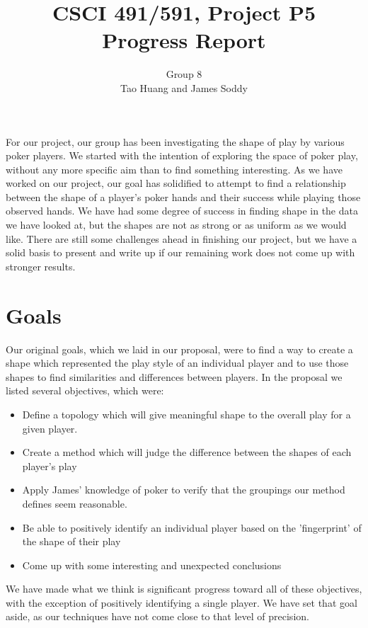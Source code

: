 \documentclass[11pt]{article}
\title{CSCI 491/591, Project P5\\
		\small{Progress Report}}
\author{Group 8\\
		\small{Tao Huang and James Soddy}}
\begin{document}
\maketitle

For our project, our group has been investigating the shape of play by various
poker players. We started with the intention of exploring the space of poker
play, without any more specific aim than to find something interesting. As we
have worked on our project, our goal has solidified to attempt to find a 
relationship between the shape of a player's poker hands and their success
while playing those observed hands. We have had some degree of success in finding
shape in the data we have looked at, but the shapes are not as strong or as 
uniform as we would like. There are still some challenges ahead in finishing our
project, but we have a solid basis to present and write up if our remaining work
does not come up with stronger results.

\section*{Goals}
Our original goals, which we laid in our proposal, were to find a way to create
a shape which represented the play style of an individual player and to use those
shapes to find similarities and differences between players. In the proposal
we listed several objectives, which were:

\begin{itemize}[noitemsep]
	\item Define a topology which will give meaningful shape to the overall play
	for a given player.
	\item Create a method which will judge the difference between the shapes of
	each player's play
	\item Apply James' knowledge of poker to verify that the groupings our method
	defines seem reasonable.
	\item Be able to positively identify an individual player based on the
	'fingerprint' of the shape of their play
	\item Come up with some interesting and unexpected conclusions
\end{itemize}

We have made what we think is significant progress toward all of these
objectives, with the exception of positively identifying a single player. We have
set that goal aside, as our techniques have not come close to that level of
precision.
\end{document}

